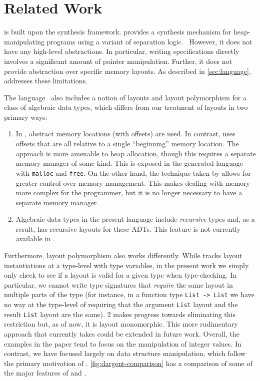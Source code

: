\section{Related Work}
\label{sec:related-work}

\tool is built upon the \suslik synthesis framework. \suslik provides
a synthesis mechanism for heap-manipulating programs using a variant
of separation logic.~\cite{polikarpova:2019:suslik} However, it does
not have any high-level abstractions. In particular, writing \suslik
specifications directly involves a significant amount of pointer
manipulation. Further, it does not provide abstraction over specific
memory layouts. As described in \autoref{sec:language}, \tool
addresses these limitations.

The  language~\cite{chen:2023:dargent} also includes a
notion of layouts and layout polymorphism for a class of algebraic
data types, which differs from our treatment of layouts in two primary
ways:

\begin{enumerate}

\item In \tool, abstract memory locations (with offsets) are used. In
  contrast,  uses offsets that are all
  relative to a single ``beginning'' memory location. The \tool
  approach is more amenable to heap allocation, though
  this requires a separate memory manager of some kind. This is
  exposed in the generated language with \verb|malloc| and
  \verb|free|.
  On the other hand, the technique taken by  allows
  for greater control over memory management. This makes
  dealing with memory more complex for the programmer, but it is no
  longer necessary to have a separate memory manager.

  \item Algebraic data types in the present language include
    \emph{recursive} types and,
    as a result, \tool has recursive layouts for these ADTs. This
    feature is not currently available in .
  \end{enumerate}

Furthermore, layout polymorphism also works differently. While
 tracks layout instantiations at a type-level with type
variables, in the present work we simply only check to see if a layout
is valid for a given type when type-checking. In particular, we cannot
write type signatures that \textit{require} the same layout in
multiple parts of the type (for instance, in a function type
\verb|List -> List| we have no way at the type-level of requiring that
the argument \verb|List| layout and the result \verb|List| layout are
the same). \Pika{} 2 makes progress towards eliminating this restriction but, as of now, it is layout monomorphic. This more rudimentary approach that \tool currently takes
could be extended in future work.
%
Overall, the examples in the  paper tend to focus on
the manipulation of integer values. In contrast, we have focused
largely on data structure manipulation, which follow the primary
motivation of \suslik. \autoref{fig:dargent-comparison} has a comparison of some of the major features of \Pika{} and .

